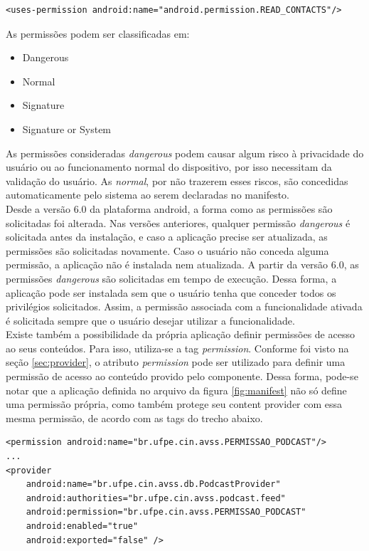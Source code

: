 \documentclass[a4paper,12pt]{article}
\numberwithin{figure}{section}
\begin{document}
{\fontsize{9pt}{12pt}
\begin{verbatim}
<uses-permission android:name="android.permission.READ_CONTACTS"/>
\end{verbatim}
}

As permissões podem ser classificadas em:
\begin{itemize}
    \item {Dangerous} 
    \item {Normal} 
    \item {Signature}
    \item {Signature or System}
\end{itemize}

As permissões consideradas \textit{dangerous} podem causar algum risco à privacidade do usuário ou ao funcionamento normal do dispositivo, por isso necessitam da validação do usuário. As \textit{normal}, por não trazerem esses riscos, são concedidas automaticamente pelo sistema ao serem declaradas no manifesto.\\

Desde a versão 6.0 da plataforma android, a forma como as permissões são solicitadas foi alterada. Nas versões anteriores, qualquer permissão \textit{dangerous} é solicitada antes da instalação, e caso a aplicação precise ser atualizada, as permissões são solicitadas novamente. Caso o usuário não conceda alguma permissão, a aplicação não é instalada nem atualizada. A partir da versão 6.0, as permissões \textit{dangerous} são solicitadas em tempo de execução. Dessa forma, a aplicação pode ser instalada sem que o usuário tenha que conceder todos os privilégios solicitados. Assim,  a permissão associada com a funcionalidade ativada é solicitada sempre que o usuário desejar utilizar a funcionalidade.\\

Existe também a possibilidade da própria aplicação definir permissões de acesso ao seus conteúdos. Para isso, utiliza-se a tag \textit{permission}. Conforme foi visto na seção \ref{sec:provider}, o atributo \textit{permission} pode ser utilizado para definir uma permissão de acesso ao conteúdo provido pelo componente. Dessa forma, pode-se notar que a aplicação definida no arquivo da figura \ref{fig:manifest} não só define uma permissão própria, como também protege seu content provider com essa mesma permissão, de acordo com as tags do trecho abaixo.

{\fontsize{9pt}{12pt}
\begin{verbatim}
<permission android:name="br.ufpe.cin.avss.PERMISSAO_PODCAST"/>
...
<provider
    android:name="br.ufpe.cin.avss.db.PodcastProvider"
    android:authorities="br.ufpe.cin.avss.podcast.feed"
    android:permission="br.ufpe.cin.avss.PERMISSAO_PODCAST"
    android:enabled="true"
    android:exported="false" />
\end{verbatim}
}
\end{document}
